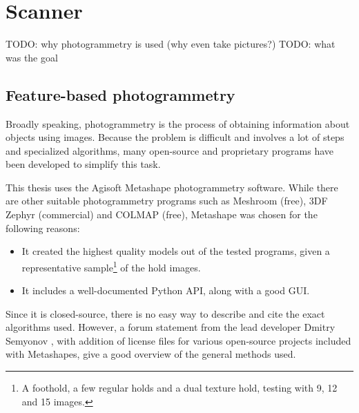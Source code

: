 \chapter{Scanner}\label{sec:scanner}
TODO: why photogrammetry is used (why even take pictures?)
TODO: what was the goal

% 

\section{Feature-based photogrammetry}
Broadly speaking, photogrammetry is the process of obtaining information about objects using images.
Because the problem is difficult and involves a lot of steps and specialized algorithms, many open-source and proprietary programs have been developed to simplify this task.

This thesis uses the Agisoft Metashape photogrammetry software.
While there are other suitable photogrammetry programs such as Meshroom (free), 3DF Zephyr (commercial) and COLMAP (free), Metashape was chosen for the following reasons:
\begin{itemize}
	\item It created the highest quality models out of the tested programs, given a representative sample\footnote{A foothold, a few regular holds and a dual texture hold, testing with 9, 12 and 15 images.} of the hold images.
	\item It includes a well-documented Python API, along with a good GUI.
\end{itemize}

Since it is closed-source, there is no easy way to describe and cite the exact algorithms used.
However, a forum statement from the lead developer Dmitry Semyonov \parencite{metashapeForumPost}, with addition of license files for various open-source projects included with Metashapes, give a good overview of the general methods used.

